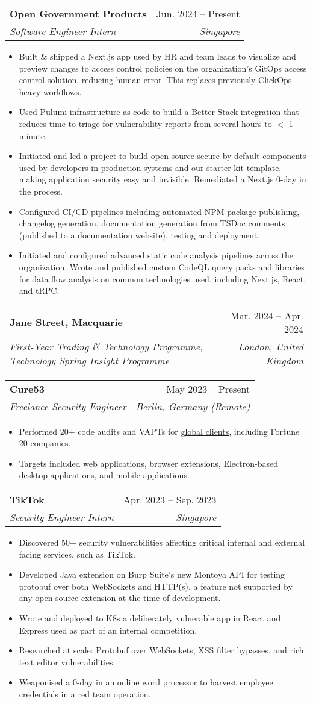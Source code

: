 \documentclass[letterpaper,10pt]{article}
\makeatletter
\newcommand{\link}[2]{\href{#1}{\color{blue}\underline{#2}}}
\newcommand{\resumeItem}[1]{
  \item\small{
    {#1 \vspace{-2pt}}
  }
}
\newcommand{\resumeSubheading}[4]{
  \vspace{-2pt}\item
  \begin{tabular*}{0.97\textwidth}[t]{l@{\extracolsep{\fill}}r}
    \textbf{#1} & #2 \\
    \textit{\small#3} & \textit{\small #4} \\
  \end{tabular*}\vspace{-7pt}
}
\newcommand{\resumeItemListStart}{\begin{itemize}}
\newcommand{\resumeItemListEnd}{\end{itemize}\vspace{-5pt}}
\makeatother
\begin{document}
\resumeSubheading {Open Government Products}{Jun.
	2024 -- Present}
{Software Engineer Intern}{Singapore}
\resumeItemListStart
\resumeItem{Built \& shipped a Next.js app used by HR and team leads to visualize and preview changes to access control policies on the organization's GitOps access control solution, reducing human error. This replaces previously ClickOps-heavy workflows.}
\resumeItem{Used Pulumi infrastructure as code to build a Better Stack integration that reduces time-to-triage for vulnerability reports from several hours to $<$ 1 minute.}
\resumeItem{Initiated and led a project to build open-source secure-by-default components used by developers in production systems and our starter kit template, making application
	security easy and invisible.
	Remediated a Next.js 0-day in the process.
}
\resumeItem{Configured CI/CD pipelines including automated NPM package publishing, changelog generation, documentation generation from TSDoc comments (published to a documentation website), testing and deployment.}
\resumeItem{Initiated and configured advanced static code analysis pipelines across the organization.
	Wrote and published custom CodeQL query packs and libraries for data flow analysis on common technologies used, including Next.js, React, and tRPC.
}
\resumeItemListEnd
\vspace{2pt}

\resumeSubheading
{Jane Street, Macquarie}{Mar. 2024 -- Apr. 2024}
{First-Year Trading \& Technology Programme, Technology Spring Insight Programme}
{London, United Kingdom}
\vspace{2pt}

\resumeSubheading
{Cure53}{May 2023 -- Present}
{Freelance Security Engineer}{Berlin, Germany (Remote)}
\resumeItemListStart
\resumeItem{Performed 20+ code audits and VAPTs for \link{https://cure53.de/\#publications}{global clients}, including Fortune 20 companies.}
\resumeItem{Targets included web applications, browser extensions, Electron-based desktop applications, and mobile applications.}
\resumeItemListEnd
\vspace{2pt}

\resumeSubheading
{TikTok}{Apr. 2023 -- Sep. 2023}
{Security Engineer Intern}{Singapore}
\resumeItemListStart
\resumeItem{Discovered 50+ security vulnerabilities affecting critical internal and external facing services, such as TikTok.}
\resumeItem{Developed Java extension on Burp Suite's new Montoya API for testing protobuf over both WebSockets and HTTP(s), a feature not supported by any open-source extension at the time of development.}
\resumeItem{Wrote and deployed to K8s a deliberately vulnerable app in React and Express used as part of an internal competition.}
\resumeItem{Researched at scale: Protobuf over WebSockets, XSS filter bypasses, and rich text editor vulnerabilities.}
\resumeItem{Weaponised a 0-day in an online word processor to harvest employee credentials in a red team operation.}
\resumeItemListEnd
\end{document}

